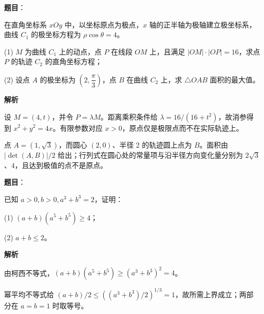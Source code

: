 \begin{answer}

\textbf{题目}：

在直角坐标系 \(xOy\) 中，以坐标原点为极点，\(x\) 轴的正半轴为极轴建立极坐标系，曲线 \(C_1\) 的极坐标方程为 \(\rho\cos\theta=4\)。

   (1) \(M\) 为曲线 \(C_1\) 上的动点，点 \(P\) 在线段 \(OM\) 上，且满足 \(|OM|\cdot|OP|=16\)，求点 \(P\) 的轨迹 \(C_2\) 的直角坐标方程；

   (2) 设点 \(A\) 的极坐标为 \((2,\dfrac{\pi}{3})\)，点 \(B\) 在曲线 \(C_2\) 上，求 \(\triangle OAB\) 面积的最大值。

\textbf{解析}


设 \(M=(4,t)\)，并令 \(P=\lambda M\)。距离乘积条件给 \(\lambda=16/(16+t^2)\)，故消参得到 \(x^2+y^2=4x\)。有限参数对应 \(x>0\)，原点仅是极限点而不在实际轨迹上。


点 \(A=(1,\sqrt3)\)，而圆心 \((2,0)\)、半径 2 的轨迹圆上点为 \(B\)。面积由 \(|\det(A,B)|/2\) 给出；行列式在圆心处的常量项与沿半径方向变化量分别为 \(2\sqrt3\)、\(4\)，且达到极值的点不是原点。



\end{answer}
\begin{answer}

\textbf{题目}：

已知 \(a>0,b>0,a^3+b^3=2\)，证明：

   (1) \((a+b)(a^5+b^5)\geq 4\)；

   (2) \(a+b\leq 2\)。

\textbf{解析}


由柯西不等式，\((a+b)(a^5+b^5)\ge(a^3+b^3)^2=4\)。


幂平均不等式给 \((a+b)/2\le((a^3+b^3)/2)^{1/3}=1\)，故所需上界成立；两部分在 \(a=b=1\) 时取等号。



\end{answer}
